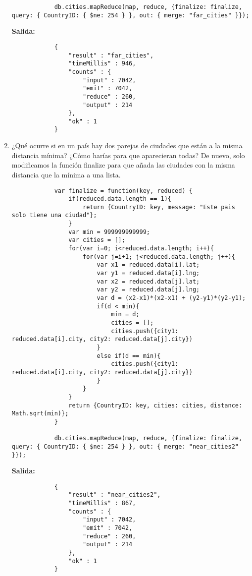 \begin{enumerate}
\begin{lstlisting}
			db.cities.mapReduce(map, reduce, {finalize: finalize, query: { CountryID: { $ne: 254 } }, out: { merge: "far_cities" }});
		\end{lstlisting}
		\textbf{Salida:}
		\begin{lstlisting}
			{
				"result" : "far_cities",
				"timeMillis" : 946,
				"counts" : {
					"input" : 7042,
					"emit" : 7042,
					"reduce" : 260,
					"output" : 214
				},
				"ok" : 1
			}
		\end{lstlisting}
		
	\item ¿Qué ocurre si en un país hay dos parejas de ciudades que están a la misma distancia mínima? ¿Cómo harías para que aparecieran todas?
		De nuevo, solo modificamos la función finalize para que añada las ciudades con la misma distancia que la mínima a una lista.
		\begin{lstlisting}
			var finalize = function(key, reduced) {
				if(reduced.data.length == 1){
					return {CountryID: key, message: "Este pais solo tiene una ciudad"};
				}
				var min = 999999999999;
				var cities = [];
				for(var i=0; i<reduced.data.length; i++){
					for(var j=i+1; j<reduced.data.length; j++){
						var x1 = reduced.data[i].lat;
						var y1 = reduced.data[i].lng;
						var x2 = reduced.data[j].lat;
						var y2 = reduced.data[j].lng;
						var d = (x2-x1)*(x2-x1) + (y2-y1)*(y2-y1);
						if(d < min){
							min = d;
							cities = [];
							cities.push({city1: reduced.data[i].city, city2: reduced.data[j].city})
						}
						else if(d == min){
							cities.push({city1: reduced.data[i].city, city2: reduced.data[j].city})
						}
					}
				}
				return {CountryID: key, cities: cities, distance: Math.sqrt(min)};
			}

			db.cities.mapReduce(map, reduce, {finalize: finalize, query: { CountryID: { $ne: 254 } }, out: { merge: "near_cities2" }});
		\end{lstlisting}
		\textbf{Salida:}
		\begin{lstlisting}
			{
				"result" : "near_cities2",
				"timeMillis" : 867,
				"counts" : {
					"input" : 7042,
					"emit" : 7042,
					"reduce" : 260,
					"output" : 214
				},
				"ok" : 1
			}
		\end{lstlisting}
		

\end{enumerate}
